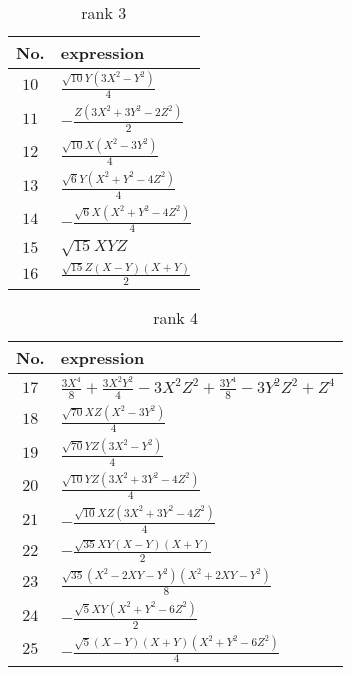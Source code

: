 \documentclass[fleqn,8pt,landscape]{jsarticle}
\begin{document}
\begin{table}[ht!]
\begin{center}
\caption{rank 3}
\renewcommand{\arraystretch}{1.3}
\begin{tabular}{cl} \hline \hline
No. & expression \\ \hline
$ 10 $ & $ \frac{\sqrt{10} Y \left(3 X^{2} - Y^{2}\right)}{4} $ \\
$ 11 $ & $ - \frac{Z \left(3 X^{2} + 3 Y^{2} - 2 Z^{2}\right)}{2} $ \\
$ 12 $ & $ \frac{\sqrt{10} X \left(X^{2} - 3 Y^{2}\right)}{4} $ \\
$ 13 $ & $ \frac{\sqrt{6} Y \left(X^{2} + Y^{2} - 4 Z^{2}\right)}{4} $ \\
$ 14 $ & $ - \frac{\sqrt{6} X \left(X^{2} + Y^{2} - 4 Z^{2}\right)}{4} $ \\
$ 15 $ & $ \sqrt{15} X Y Z $ \\
$ 16 $ & $ \frac{\sqrt{15} Z \left(X - Y\right) \left(X + Y\right)}{2} $ \\
 \hline \hline
\end{tabular}
\end{center}
\end{table}
\begin{table}[ht!]
\begin{center}
\caption{rank 4}
\renewcommand{\arraystretch}{1.3}
\begin{tabular}{cl} \hline \hline
No. & expression \\ \hline
$ 17 $ & $ \frac{3 X^{4}}{8} + \frac{3 X^{2} Y^{2}}{4} - 3 X^{2} Z^{2} + \frac{3 Y^{4}}{8} - 3 Y^{2} Z^{2} + Z^{4} $ \\
$ 18 $ & $ \frac{\sqrt{70} X Z \left(X^{2} - 3 Y^{2}\right)}{4} $ \\
$ 19 $ & $ \frac{\sqrt{70} Y Z \left(3 X^{2} - Y^{2}\right)}{4} $ \\
$ 20 $ & $ \frac{\sqrt{10} Y Z \left(3 X^{2} + 3 Y^{2} - 4 Z^{2}\right)}{4} $ \\
$ 21 $ & $ - \frac{\sqrt{10} X Z \left(3 X^{2} + 3 Y^{2} - 4 Z^{2}\right)}{4} $ \\
$ 22 $ & $ - \frac{\sqrt{35} X Y \left(X - Y\right) \left(X + Y\right)}{2} $ \\
$ 23 $ & $ \frac{\sqrt{35} \left(X^{2} - 2 X Y - Y^{2}\right) \left(X^{2} + 2 X Y - Y^{2}\right)}{8} $ \\
$ 24 $ & $ - \frac{\sqrt{5} X Y \left(X^{2} + Y^{2} - 6 Z^{2}\right)}{2} $ \\
$ 25 $ & $ - \frac{\sqrt{5} \left(X - Y\right) \left(X + Y\right) \left(X^{2} + Y^{2} - 6 Z^{2}\right)}{4} $ \\
 \hline \hline
\end{tabular}
\end{center}
\end{table}
\end{document}
